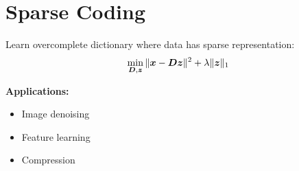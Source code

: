 
\section{Sparse Coding}
\label{sec:sparse-coding}

Learn overcomplete dictionary where data has sparse representation:
\begin{equation}
\min_{\boldsymbol{D}, \boldsymbol{z}} \|\boldsymbol{x} - \boldsymbol{D}\boldsymbol{z}\|^2 + \lambda \|\boldsymbol{z}\|_1
\end{equation}

\textbf{Applications:}
\begin{itemize}
    \item Image denoising
    \item Feature learning
    \item Compression
\end{itemize}
